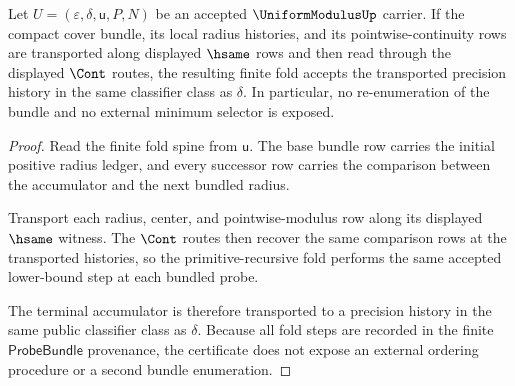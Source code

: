 \begin{theorem}
\label{thm:uniform-modulus-finite-bundle-fold-stability}
Let $U=(\varepsilon,\delta,\mathsf{u},P,N)$ be an accepted
$\UniformModulusUp$ carrier. If the compact cover bundle, its local radius
histories, and its pointwise-continuity rows are transported along displayed
$\hsame$ rows and then read through the displayed $\Cont$ routes, the resulting
finite fold accepts the transported precision history in the same classifier
class as $\delta$. In particular, no re-enumeration of the bundle and no
external minimum selector is exposed.
\end{theorem}
\begin{proof}
Read the finite fold spine from $\mathsf{u}$. The base bundle row carries the
initial positive radius ledger, and every successor row carries the comparison
between the accumulator and the next bundled radius.

Transport each radius, center, and pointwise-modulus row along its displayed
$\hsame$ witness. The $\Cont$ routes then recover the same comparison rows at
the transported histories, so the primitive-recursive fold performs the same
accepted lower-bound step at each bundled probe.

The terminal accumulator is therefore transported to a precision history in the
same public classifier class as $\delta$. Because all fold steps are recorded in
the finite $\mathsf{ProbeBundle}$ provenance, the certificate does not expose an
external ordering procedure or a second bundle enumeration.
\end{proof}

